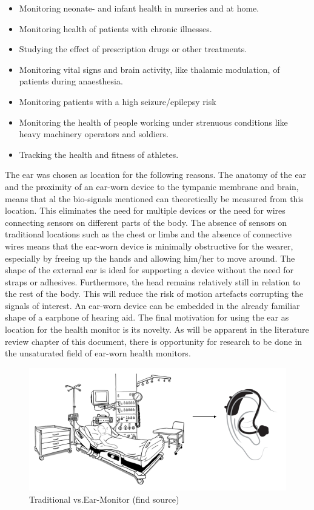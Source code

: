 \begin{itemize}
\item Monitoring neonate- and infant health in nurseries and at home.
\item Monitoring health of patients with chronic illnesses.
\item Studying the effect of prescription drugs or other treatments.
\item Monitoring vital signs and brain activity, like thalamic modulation, of patients during anaesthesia.
\item Monitoring patients with a high seizure/epilepsy risk
\item Monitoring the health of people working under strenuous conditions like heavy machinery operators and soldiers.
\item Tracking the health and fitness of athletes.
\end{itemize}

The ear was chosen as location for the following reasons. The anatomy of the ear and the proximity of an ear-worn device to the tympanic membrane and brain, means that al the bio-signals mentioned can theoretically be measured from this location. This eliminates the need for multiple devices or the need for wires connecting sensors on different parts of the body. The absence of sensors on traditional locations such as the chest or limbs and the absence of connective wires means that the ear-worn device is minimally obstructive for the wearer, especially by freeing up the hands and allowing him/her to move around. The shape of the external ear is ideal for supporting a device without the need for straps or adhesives. Furthermore, the head remains relatively still in relation to the rest of the body. This will reduce the risk of motion artefacts corrupting the signals of interest. An ear-worn device can be embedded in the already familiar shape of a earphone of hearing aid. The final motivation for using the ear as location for the health monitor is its novelty. As will be apparent in the literature review chapter of this document, there is opportunity for research to be done in the unsaturated field of ear-worn health monitors.

\begin{figure}[b]
   \centering
   \includegraphics[scale=0.7]{figs/TraditionalICU}
   \caption{Traditional vs.Ear-Monitor (find source)}
   \label{fig:TraditionalICU}
\end{figure}